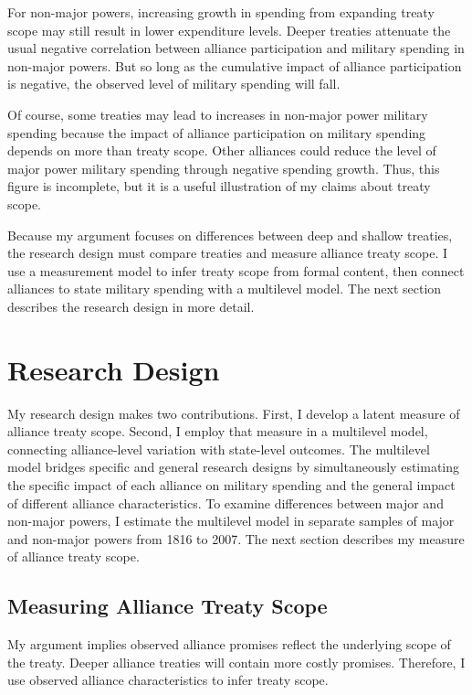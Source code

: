 \documentclass[12pt]{article}
\begin{document}
For non-major powers, increasing growth in spending from expanding treaty scope may still result in lower expenditure levels. 
Deeper treaties attenuate the usual negative correlation between alliance participation and military spending in non-major powers. 
But so long as the cumulative impact of alliance participation is negative, the observed level of military spending will fall. 


Of course, some treaties may lead to increases in non-major power military spending because the impact of alliance participation on military spending depends on more than treaty scope. 
Other alliances could reduce the level of major power military spending through negative spending growth.
Thus, this figure is incomplete, but it is a useful illustration of my claims about treaty scope. 


Because my argument focuses on differences between deep and shallow treaties, the research design must compare treaties and measure alliance treaty scope.  
I use a measurement model to infer treaty scope from formal content, then connect alliances to state military spending with a multilevel model. 
The next section describes the research design in more detail. 



\section{Research Design} 


My research design makes two contributions. 
First, I develop a latent measure of alliance treaty scope. 
Second, I employ that measure in a multilevel model, connecting alliance-level variation with state-level outcomes. 
The multilevel model bridges specific and general research designs by simultaneously estimating the specific impact of each alliance on military spending and the general impact of different alliance characteristics. 
To examine differences between major and non-major powers, I estimate the multilevel model in separate samples of major and non-major powers from 1816 to 2007. 
The next section describes my measure of alliance treaty scope. 


\subsection{Measuring Alliance Treaty Scope} 


My argument implies observed alliance promises reflect the underlying scope of the treaty. 
Deeper alliance treaties will contain more costly promises. 
Therefore, I use observed alliance characteristics to infer treaty scope.
\end{document}
